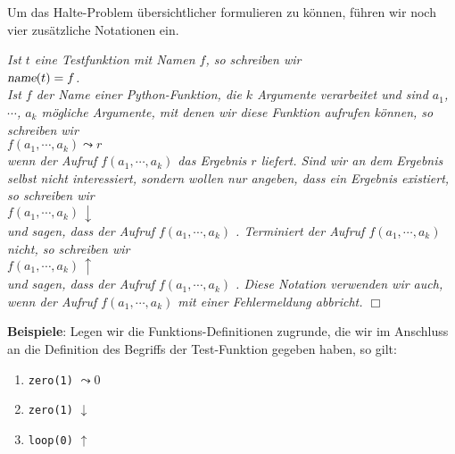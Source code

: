 Um das Halte-Problem übersichtlicher formulieren zu können, führen wir noch vier
zusätzliche Notationen ein.
\begin{Notation}
{\em
Ist $t$ eine Testfunktion mit Namen $f$, so schreiben wir 
\\[0.2cm]
\hspace*{1.3cm}
$\textsl{name}(t) = f$.
\\[0.2cm]
Ist $f$ der Name einer \textsl{Python}-Funktion, die $k$ Argumente verarbeitet und sind $a_1$, $\cdots$, $a_k$ mögliche
Argumente, mit denen wir diese Funktion aufrufen können,
so schreiben wir \\[0.3cm]
\hspace*{1.3cm} $f(a_1, \cdots, a_k) \leadsto r$ \\[0.3cm]
wenn der Aufruf $f(a_1, \cdots, a_k)$ das Ergebnis $r$ liefert.  Sind wir an dem Ergebnis
selbst nicht interessiert, sondern wollen nur angeben, dass ein Ergebnis existiert, so
schreiben wir \\[0.3cm]
\hspace*{1.3cm} $f(a_1, \cdots, a_k) \,\downarrow$ \\[0.3cm]
und sagen, dass der Aufruf $f(a_1, \cdots, a_k)$ .
Terminiert der Aufruf $f(a_1, \cdots, a_k)$ nicht, so schreiben wir \\[0.3cm]
\hspace*{1.3cm} $f(a_1, \cdots, a_k) \,\uparrow$ \\[0.3cm]
und sagen, dass der Aufruf $f(a_1, \cdots, a_k)$ .  Diese Notation
verwenden wir auch, wenn der Aufruf  $f(a_1, \cdots, a_k)$ mit einer Fehlermeldung abbricht.
\hspace*{\fill} $\Box$
}
\end{Notation}

\noindent
\textbf{Beispiele}: Legen wir die Funktions-Definitionen zugrunde, die wir im Anschluss an
die Definition des Begriffs der Test-Funktion gegeben haben, so gilt:
\begin{enumerate}
\item {\tt zero(1)} $\leadsto 0$
\item {\tt zero(1)} $\downarrow$
\item {\tt loop(0)} $\uparrow$
\end{enumerate} 

